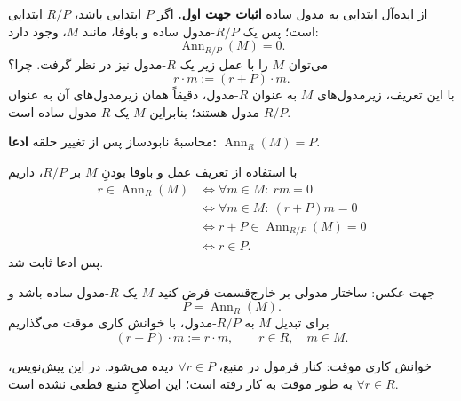 \begin{frame}[t]{از ایده‌آل ابتدایی به مدول ساده}
    \label{lec14:primitive-ideal-restriction}
    \textbf{اثبات جهت اول.} اگر \(P\) ابتدایی باشد، \(R/P\) ابتدایی است؛ پس یک \(R/P\)-مدول ساده و باوفا، مانند \(M\)، وجود دارد:
    \[
        \operatorname{Ann}_{R/P}(M)=0.
    \]
    می‌توان \(M\) را با عمل زیر یک \(R\)-مدول نیز در نظر گرفت. \alert{چرا؟}
    \[
        r\cdot m:=(r+P)\cdot m.
    \]
    با این تعریف، زیرمدول‌های \(M\) به عنوان \(R\)-مدول، دقیقاً همان زیرمدول‌های آن به عنوان \(R/P\)-مدول هستند؛ بنابراین \(M\) یک \(R\)-مدول ساده است.
\end{frame}

\begin{frame}[t]{محاسبهٔ نابودساز پس از تغییر حلقه}
    \label{lec14:primitive-ideal-annihilator}
    \textbf{ادعا:} \(\operatorname{Ann}_R(M)=P\).
    \medskip

    با استفاده از تعریف عمل و باوفا بودنِ \(M\) بر \(R/P\)، داریم
    \[
        \begin{aligned}
            r\in\operatorname{Ann}_R(M)
            &\Longleftrightarrow \forall m\in M:\ rm=0\\
            &\Longleftrightarrow \forall m\in M:\ (r+P)m=0\\
            &\Longleftrightarrow r+P\in\operatorname{Ann}_{R/P}(M)=0\\
            &\Longleftrightarrow r\in P.
        \end{aligned}
    \]
    پس ادعا ثابت شد.
\end{frame}

\begin{frame}[t]{جهت عکس: ساختار مدولی بر خارج‌قسمت}
    \label{lec14:quotient-action-pending}
    فرض کنید \(M\) یک \(R\)-مدول ساده باشد و
    \[
        P=\operatorname{Ann}_R(M).
    \]
    برای تبدیل \(M\) به \(R/P\)-مدول، با خوانش کاری موقت می‌گذاریم
    \[
        (r+P)\cdot m:=r\cdot m,\qquad r\in R,\quad m\in M.
    \]
    \begin{alertblock}{خوانش کاری موقت: }
        کنار فرمول در منبع، \(\forall r\in P\) دیده می‌شود. در این پیش‌نویس، \(\forall r\in R\) به طور موقت به کار رفته است؛ این اصلاحِ منبع قطعی نشده است.
    \end{alertblock}
\end{frame}

